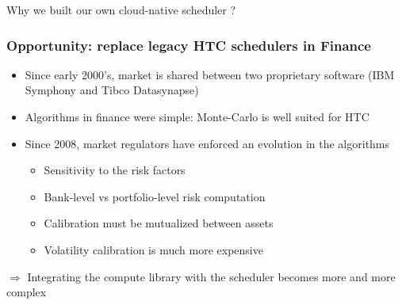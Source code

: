 \documentclass[10pt,aspectratio=1609]{beamer}
\begin{document}
\begin{section}{Why we built our own cloud-native scheduler ?}
  \begin{frame}
    \frametitle{Opportunity: replace legacy HTC schedulers in Finance}
    \begin{itemize}
      \item Since early 2000's, market is shared between two proprietary software (IBM Symphony and Tibco Datasynapse)
      \item Algorithms in finance were simple: Monte-Carlo is well suited for HTC
      \item Since 2008, market regulators have enforced an evolution in the algorithms
      \begin{itemize}
        \item Sensitivity to the risk factors
        \item Bank-level vs portfolio-level risk computation
        \item Calibration must be mutualized between assets
        \item Volatility calibration is much more expensive
      \end{itemize}
    \end{itemize}
    
    $\Rightarrow$ Integrating the compute library with the scheduler becomes more and more complex
  \end{frame}



\end{section}
\end{document}
